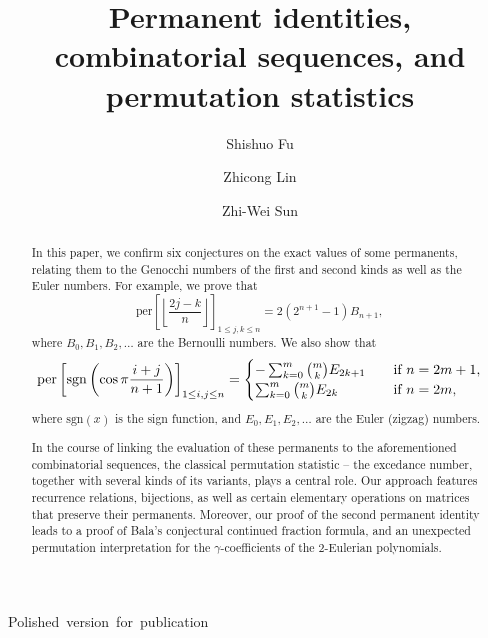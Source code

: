 \documentclass[11pt,reqno]{amsart}
\numberwithin{equation}{section}
\theoremstyle{plain}
\theoremstyle{definition}
\def\per{\mathrm{per}}
\def\sgn{\mathrm{sgn}}
\def\per{{\rm per}}
\begin{document}
\hbox{Polished version for publication}
\medskip

\title{Permanent identities, combinatorial sequences, and permutation statistics}

\author[S. Fu]{Shishuo Fu}
\address[Shishuo Fu]{College of Mathematics and Statistics, Chongqing University, Huxi campus, Chongqing 401331, P.R. China}

\author[Z. Lin]{Zhicong Lin}
\address[Zhicong Lin]{Research Center for Mathematics and Interdisciplinary Sciences, Shandong University \& Frontiers Science Center for Nonlinear Expectations, Ministry of Education, Qingdao 266237, P.R. China}

\author[Z.-W. Sun]{Zhi-Wei Sun}
\address[Zhi-Wei Sun, corresponding author]{School of Mathematics, Nanjing University, Nanjing 210093, P.R. China}



\begin{abstract}
In this paper, we confirm six conjectures on the exact values of some permanents, relating them to the Genocchi numbers of the first and second kinds as well as the Euler numbers. For example, we prove that
$$\mathrm{per}\left[\left\lfloor\frac{2j-k}{n}\right\rfloor\right]_{1\le j,k\le n}=2(2^{n+1}-1)B_{n+1},$$
where $B_0,B_1,B_2,\ldots$ are the Bernoulli numbers.
We also show that
$$
\per\left[\sgn\left(\cos\pi\frac{i+j}{n+1}\right)\right]_{1\le i,j\le n}=\begin{cases}
-\sum_{k=0}^m\binom{m}{k}E_{2k+1}&\quad\text{if $n=2m+1$},\\
\sum_{k=0}^m\binom{m}{k}E_{2k}&\quad\text{if $n=2m$},
\end{cases}
$$
where $\sgn(x)$ is the sign function, and $E_0,E_1,E_2,\ldots$ are the Euler (zigzag) numbers.

 In the course of linking the evaluation of these permanents to the aforementioned combinatorial sequences, the classical permutation statistic -- the excedance number, together with several kinds of its variants, plays a central role. Our approach features recurrence relations, bijections, as well as certain elementary operations on matrices that preserve their permanents. Moreover, our proof of the second permanent identity leads to  a proof of Bala's conjectural continued fraction formula, and an unexpected permutation interpretation for the $\gamma$-coefficients of the $2$-Eulerian polynomials.

\end{abstract}
\end{document}
